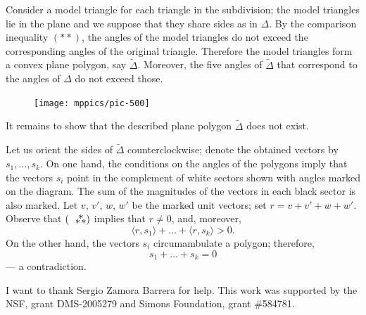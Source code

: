 \documentclass[oneside,a4paper]{amsart}
\begin{document}
Consider a model triangle for each triangle in the subdivision;
the model triangles lie in the plane and we suppose that they share sides as in $\Delta$.
By the comparison inequality $({*}{*})$, the angles of the model triangles do not exceed the corresponding angles of the original triangle.
Therefore the model triangles form a convex plane polygon, say $\tilde\Delta$.
Moreover, the five angles of $\tilde\Delta$ that correspond to the angles of $\Delta$ do not exceed those.

\begin{figure}
\vskip-5mm
\centering
\texttt{[image: mppics/pic-500]}
\vskip-1mm
\end{figure}

It remains to show that the described plane polygon $\tilde\Delta$ does not exist.

Let us orient the sides of $\tilde\Delta$ counterclockwise;
denote the obtained vectors by $s_1,\dots,s_k$.
On one hand, the conditions on the angles of the polygons imply that the vectors $s_i$ point in the complement of white sectors shown with angles marked on the diagram.
The sum of the magnitudes of the vectors in each black sector is also marked.
Let $v$, $v'$, $w$, $w'$ be the marked unit vectors;
set $r=v+v'+w+w'$.
Observe that $(\asterism)$ implies that $r\ne 0$,
and, moreover, 
\[\langle r,s_1\rangle+\dots+\langle r,s_k\rangle>0.\]
On the other hand, the vectors $s_i$ circumambulate a polygon; therefore, 
\[s_1+\dots+s_k=0\]
--- a contradiction.

{\small {}
I want to thank Sergio Zamora Barrera for help.
This work was supported by the NSF, grant DMS-2005279 and Simons Foundation, grant \#584781.}



{\sloppy
\printbibliography
\fussy
}
\end{document}
